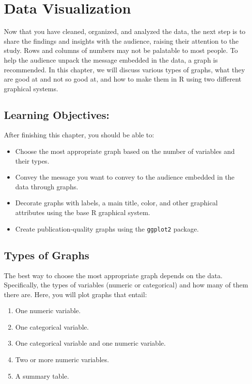 \documentclass[
  letterpaper,
  DIV=11,
  numbers=noendperiod]{scrreprt}
\begin{document}
\chapter{Data Visualization}\label{sec-03-data-visualization}

Now that you have cleaned, organized, and analyzed the data, the next
step is to share the findings and insights with the audience, raising
their attention to the study. Rows and columns of numbers may not be
palatable to most people. To help the audience unpack the message
embedded in the data, a graph is recommended. In this chapter, we will
discuss various types of graphs, what they are good at and not so good
at, and how to make them in R using two different graphical systems.

\section*{Learning Objectives:}\label{learning-objectives-2}


After finishing this chapter, you should be able to:

\begin{itemize}
\item
  Choose the most appropriate graph based on the number of variables and
  their types.
\item
  Convey the message you want to convey to the audience embedded in the
  data through graphs.
\item
  Decorate graphs with labels, a main title, color, and other graphical
  attributes using the base R graphical system.
\item
  Create publication-quality graphs using the \texttt{ggplot2} package.
\end{itemize}

\section{Types of Graphs}\label{types-of-graphs}

The best way to choose the most appropriate graph depends on the data.
Specifically, the types of variables (numeric or categorical) and how
many of them there are. Here, you will plot graphs that entail:

\begin{enumerate}
\def\labelenumi{\arabic{enumi}.}
\item
  One numeric variable.
\item
  One categorical variable.
\item
  One categorical variable and one numeric variable.
\item
  Two or more numeric variables.
\item
  A summary table.
\end{enumerate}
\end{document}
